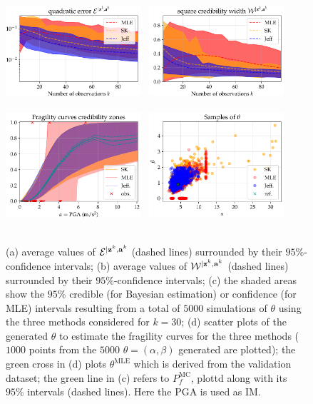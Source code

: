     \begin{figure}[!h]
        \centering
        {\includegraphics[width=5cm]{figures/uncIM/err_quadra_ASG_PGA.pdf}}\ %
        {\includegraphics[width=5cm]{figures/uncIM/err_cred_ASG_PGA.pdf}} \\
        \ \\
        {\includegraphics[width=5cm]{figures/uncIM/curves_ASG_PGA.pdf}}\ %
        {\includegraphics[width=5cm]{figures/uncIM/scatter_ASG_PGA.pdf}}\\
        \ 
         \caption{(a) average values of $\mathcal{E}^{|\mathbf{z}^k,\mathbf{a}^k}$ (dashed lines) surrounded by their $95\%$-confidence intervals; (b) average values of $\mathcal{W}^{|\mathbf{z}^k,\mathbf{a}^k}$ (dashed lines) surrounded by their $95\%$-confidence intervals; (c) %
         the shaded areas show the $95\%$ credible (for Bayesian estimation) or confidence (for MLE) intervals resulting from a total of $5000$ simulations of $\theta$ using the three methods considered for $k = 30$; (d) scatter plots of the generated $\theta$ to estimate the fragility curves for the three methods ($1000$ points from the $5000$ $\theta=(\alpha,\beta)$ generated are plotted); the green cross in (d) plots $\theta^{\mathrm{MLE}}$ which is derived from the validation dataset; the green line in (c) refers to $P^\text{MC}_f$, plottd along with its $95\%$ intervals (dashed lines). Here the PGA is used as IM.}
           \label{uncIM:fig:ASG-curves-PGA}
    \end{figure}

